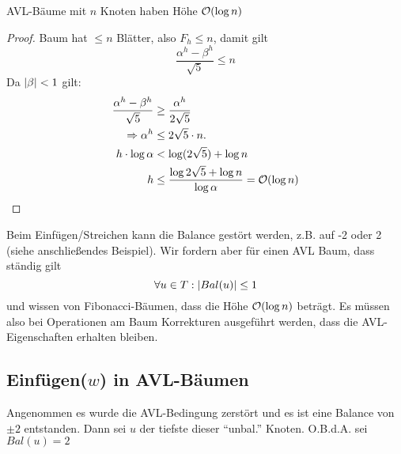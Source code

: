         \begin{lemma}
            AVL-Bäume mit $n$ Knoten haben Höhe $\mathcal{O}(\log n)$ 
        \end{lemma}

        \begin{proof}
            Baum hat $\leq n$ Blätter, also $F_h \leq n$, damit gilt 
            $$
                \frac{\alpha^h - \beta^h}{\sqrt{5}} \leq n
            $$ 
            Da $\left| \beta \right| < 1$ gilt: 
            \begin{align*}            
                \frac{\alpha^h - \beta^h}{\sqrt{5}} &\geq \frac{\alpha^h}{2 \sqrt{5}} \\
                \Ra \alpha^h &\leq 2 \sqrt{5} \cdot n. \\
                h \cdot \log \alpha &< \log (2\sqrt{5}) + \log n \\
                h &\leq \frac{\log 2\sqrt{5} + \log n}{\log \alpha} = \LO(\log n)
            \end{align*}
        \end{proof}

        Beim Einfügen/Streichen kann die Balance gestört werden, z.B. auf -2 oder 2 (siehe anschließendes Beispiel). Wir fordern aber für einen AVL Baum, dass ständig gilt 
        $$
            \forall u \in T : \lvert Bal(u)\rvert \leq 1 
        $$
        und wissen von Fibonacci-Bäumen, dass die Höhe $\mathcal{O}(\log n)$ beträgt. Es müssen also bei Operationen am Baum Korrekturen ausgeführt werden,
        dass die AVL-Eigenschaften erhalten bleiben.
   
        \subsection{Einfügen($w$) in AVL-Bäumen}
            Angenommen es wurde die AVL-Bedingung zerstört und es ist eine Balance von $\pm 2$ entstanden. Dann sei $u$ der tiefste dieser "`unbal."' Knoten. O.B.d.A. sei $Bal(u)=2$ \\
            
